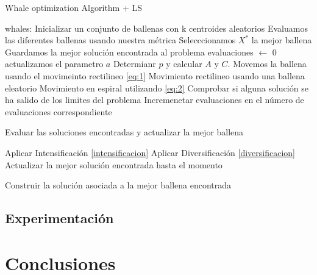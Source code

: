 \documentclass[11pt]{article}
\begin{document}
\begin{algorithm}[H]
  \caption{Whale optimization Algorithm + LS}
  \label{alg-lsearch}
  \begin{algorithmic}[1]
    \State whales: Inicializar un conjunto de ballenas con k centroides aleatorios
    \State Evaluamos las diferentes ballenas usando nuestra métrica 
    \State Selecccionamos $X^*$ la mejor ballena
    \State Guardamos la mejor solución encontrada al problema
    \State evaluaciones $\leftarrow$ 0
    \State actualizamos el parametro $a$
    \State Determianr $p$ y calcular  $A$ y $C$.
    \State Movemos la ballena usando el movimeinto rectilineo \eqref{eq:1}
    \State Movimiento rectilineo usando una ballena eleatorio
    \EndIf
    \Else
    \State Movimiento en espiral utilizando \eqref{eq:2}
    \EndIf
    \EndFor 
    \State Comprobar si alguna solución se ha salido de los limites del problema
    \State Incremenetar evaluaciones en el número de evaluaciones correspondiente
    
    \State Evaluar las soluciones encontradas y actualizar la mejor ballena 

    \State Aplicar Intensificación \ref{intensificacion}
    \Else
    \State Aplicar Diversificación \ref{diversificacion}
    \EndIf
    \EndIf    
    \State Actualizar la mejor solución encontrada hasta el momento
    \EndIf

    \EndWhile
    \State
    \Return Construir la solución asociada a la mejor ballena encontrada
    \EndProcedure
  \end{algorithmic}
\end{algorithm}

\subsection{Experimentación}







\section{Conclusiones}
\end{document}
